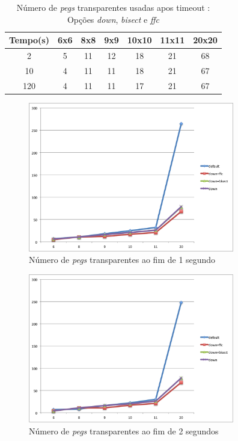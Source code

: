 \documentclass{llncs}
\begin{document}
\setlength{\tabcolsep}{12pt}
\begin{table}[ht!] 
\caption{N\'{u}mero de \emph{pegs} transparentes usadas apos timeout : Op\c{c}\~{o}es \emph{down}, \emph{bisect} e \emph{ffc}} %
\centering %
\begin{tabular}{c c c c c c c} %
\hline\hline %

Tempo(s) & 6x6 & 8x8 & 9x9 & 10x10 & 11x11 & 20x20\\ [0.5ex] %
\hline %
2 & 5 & 11 & 12 & 18 & 21 & 68 \\
10 & 4 & 11 & 11 & 18 & 21 & 67 \\
120 & 4 & 11 & 11 & 17 & 21 & 67 \\[1 ex]
\hline %
\end{tabular} 
\label{tabela:9} %
\end{table}



\begin{figure}[ht]
\centering
\includegraphics[width=90mm]{grafico3.png}
\caption{N\'{u}mero de \emph{pegs} transparentes ao fim de 1 segundo}
\label{graf1}
\end{figure}


\begin{figure}[ht]
\centering
\includegraphics[width=90mm]{grafico2.png}
\caption{N\'{u}mero de \emph{pegs} transparentes ao fim de 2 segundos}
\label{graf2}
\end{figure}
\end{document}

